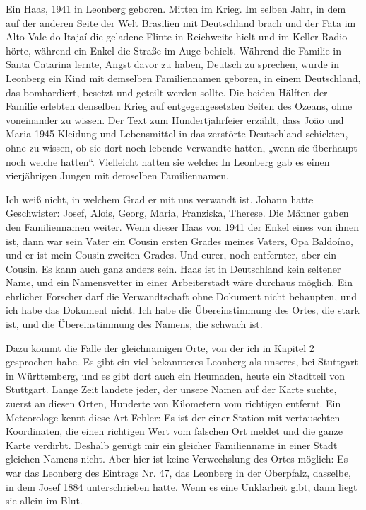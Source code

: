 \documentclass[
  ngerman,
  11pt,
  openany]{book}
\begin{document}
Ein Haas, 1941 in Leonberg geboren. Mitten im Krieg. Im selben Jahr, in
dem auf der anderen Seite der Welt Brasilien mit Deutschland brach und
der Fata im Alto Vale do Itajaí die geladene Flinte in Reichweite hielt
und im Keller Radio hörte, während ein Enkel die Straße im Auge behielt.
Während die Familie in Santa Catarina lernte, Angst davor zu haben,
Deutsch zu sprechen, wurde in Leonberg ein Kind mit demselben
Familiennamen geboren, in einem Deutschland, das bombardiert, besetzt
und geteilt werden sollte. Die beiden Hälften der Familie erlebten
denselben Krieg auf entgegengesetzten Seiten des Ozeans, ohne
voneinander zu wissen. Der Text zum Hundertjahrfeier erzählt, dass João
und Maria 1945 Kleidung und Lebensmittel in das zerstörte Deutschland
schickten, ohne zu wissen, ob sie dort noch lebende Verwandte hatten,
„wenn sie überhaupt noch welche hatten``. Vielleicht hatten sie welche:
In Leonberg gab es einen vierjährigen Jungen mit demselben
Familiennamen.

Ich weiß nicht, in welchem Grad er mit uns verwandt ist. Johann hatte
Geschwister: Josef, Alois, Georg, Maria, Franziska, Therese. Die Männer
gaben den Familiennamen weiter. Wenn dieser Haas von 1941 der Enkel
eines von ihnen ist, dann war sein Vater ein Cousin ersten Grades meines
Vaters, Opa Baldoíno, und er ist mein Cousin zweiten Grades. Und eurer,
noch entfernter, aber ein Cousin. Es kann auch ganz anders sein. Haas
ist in Deutschland kein seltener Name, und ein Namensvetter in einer
Arbeiterstadt wäre durchaus möglich. Ein ehrlicher Forscher darf die
Verwandtschaft ohne Dokument nicht behaupten, und ich habe das Dokument
nicht. Ich habe die Übereinstimmung des Ortes, die stark ist, und die
Übereinstimmung des Namens, die schwach ist.

Dazu kommt die Falle der gleichnamigen Orte, von der ich in Kapitel 2
gesprochen habe. Es gibt ein viel bekannteres Leonberg als unseres, bei
Stuttgart in Württemberg, und es gibt dort auch ein Heumaden, heute ein
Stadtteil von Stuttgart. Lange Zeit landete jeder, der unsere Namen auf
der Karte suchte, zuerst an diesen Orten, Hunderte von Kilometern vom
richtigen entfernt. Ein Meteorologe kennt diese Art Fehler: Es ist der
einer Station mit vertauschten Koordinaten, die einen richtigen Wert vom
falschen Ort meldet und die ganze Karte verdirbt. Deshalb genügt mir ein
gleicher Familienname in einer Stadt gleichen Namens nicht. Aber hier
ist keine Verwechslung des Ortes möglich: Es war das Leonberg des
Eintrags Nr. 47, das Leonberg in der Oberpfalz, dasselbe, in dem Josef
1884 unterschrieben hatte. Wenn es eine Unklarheit gibt, dann liegt sie
allein im Blut.
\end{document}
